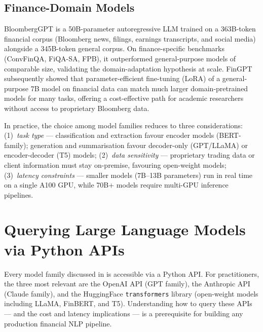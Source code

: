 \begin{deepdive}
\subsection{Finance-Domain Models}
\label{sec:llm-finance-models}

BloombergGPT \cite{wu2023bloomberggpt}
is a 50B-parameter autoregressive LLM trained on a 363B-token financial
corpus (Bloomberg news, filings, earnings transcripts, and social media)
alongside a 345B-token general corpus.  On finance-specific benchmarks
(ConvFinQA, FiQA-SA, FPB), it outperformed general-purpose models of
comparable size, validating the domain-adaptation hypothesis at scale.
FinGPT \cite{Yang2023}
subsequently showed that parameter-efficient fine-tuning (LoRA) of a
general-purpose 7B model on financial data can match much larger
domain-pretrained models for many tasks, offering a cost-effective path
for academic researchers without access to proprietary Bloomberg data.

\begin{remark}
\label{rem:model-selection}
In practice, the choice among model families reduces to three
considerations: (1)~\emph{task type} — classification and extraction
favour encoder models (BERT-family); generation and summarisation favour
decoder-only (GPT/LLaMA) or encoder-decoder (T5) models;
(2)~\emph{data sensitivity} — proprietary trading data or client
information must stay on-premise, favouring open-weight models;
(3)~\emph{latency constraints} — smaller models (7B–13B parameters)
run in real time on a single A100 GPU, while 70B+ models require
multi-GPU inference pipelines.
\end{remark}

\end{deepdive}

\section{Querying Large Language Models via Python APIs}
\label{sec:llm-apis}

\begin{context}
Every model family discussed in  is
accessible via a Python API.  For practitioners, the three most relevant
are the OpenAI API (GPT family), the Anthropic API (Claude family), and
the HuggingFace \texttt{transformers} library (open-weight models
including LLaMA, FinBERT, and T5).  Understanding how to query these APIs —
and the cost and latency implications — is a prerequisite for building any
production financial NLP pipeline.
\end{context}


